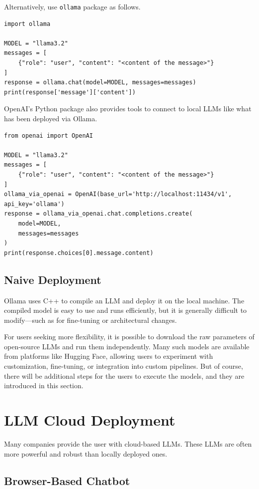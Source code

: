 Alternatively, use \verb|ollama| package as follows.
\begin{lstlisting}
import ollama

MODEL = "llama3.2"
messages = [
    {"role": "user", "content": "<content of the message>"}
]
response = ollama.chat(model=MODEL, messages=messages)
print(response['message']['content'])
\end{lstlisting}

OpenAI's Python package also provides tools to connect to local LLMs like what has been deployed via Ollama.

\begin{lstlisting}
from openai import OpenAI

MODEL = "llama3.2"
messages = [
    {"role": "user", "content": "<content of the message>"}
]
ollama_via_openai = OpenAI(base_url='http://localhost:11434/v1', api_key='ollama')
response = ollama_via_openai.chat.completions.create(
    model=MODEL,
    messages=messages
)
print(response.choices[0].message.content)
\end{lstlisting}

\subsection{Naive Deployment}

Ollama uses C++ to compile an LLM and deploy it on the local machine. The compiled model is easy to use and runs efficiently, but it is generally difficult to modify—such as for fine-tuning or architectural changes.

For users seeking more flexibility, it is possible to download the raw parameters of open-source LLMs and run them independently. Many such models are available from platforms like Hugging Face, allowing users to experiment with customization, fine-tuning, or integration into custom pipelines. But of course, there will be additional steps for the users to execute the models, and they are introduced in this section.




\section{LLM Cloud Deployment}

Many companies provide the user with cloud-based LLMs. These LLMs are often more powerful and robust than locally deployed ones. 

\subsection{Browser-Based Chatbot}

